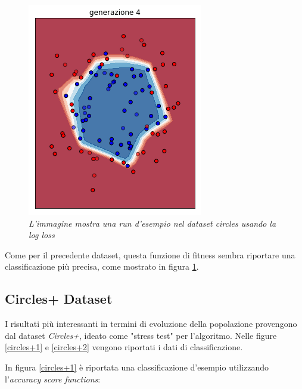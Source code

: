 \documentclass[12pt,a4paper]{report}
\begin{document}
\begin{figure}[H]
 \includegraphics[scale = 0.4]{images/circle-rnd-log/4}
 \caption{\textit{L'immagine mostra una run d'esempio nel dataset circles usando la log loss}}
 \label{circles2}
\end{figure}

Come per il precedente dataset, questa funzione di fitness sembra riportare una classificazione più precisa, come mostrato in figura \ref{circles2}.


\subsection{Circles+ Dataset}

I risultati più interessanti in termini di evoluzione della popolazione provengono dal dataset \textit{Circles+}, ideato come "stress test" per l'algoritmo. Nelle figure \ref{circles+1} e \ref{circles+2} vengono riportati i dati di classificazione.

In figura \ref{circles+1} è riportata una classificazione d'esempio utilizzando l'\textit{accuracy score functions}:
\end{document}
